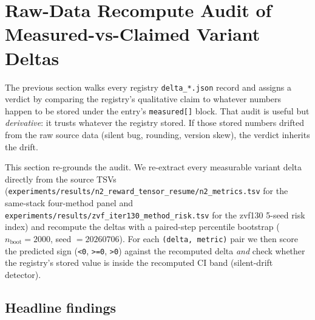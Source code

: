 \section{Raw-Data Recompute Audit of Measured-vs-Claimed Variant Deltas}
\label{sec:p6-iter190-raw-recompute}

The previous  section walks every registry
\texttt{delta\_*.json} record and assigns a verdict by comparing the
registry's qualitative claim to whatever numbers happen to be stored under
the entry's \texttt{measured[]} block. That audit is useful but
\emph{derivative}: it trusts whatever the registry stored. If those stored
numbers drifted from the raw source data (silent bug, rounding, version
skew), the verdict inherits the drift.

This section re-grounds the audit. We re-extract every measurable
variant delta directly from the source TSVs
(\texttt{experiments/results/n2\_reward\_tensor\_resume/n2\_metrics.tsv}
for the same-stack four-method panel and
\texttt{experiments/results/zvf\_iter130\_method\_risk.tsv} for the
zvf130 5-seed risk index) and recompute the deltas with a paired-step
percentile bootstrap ($n_{\text{boot}}{=}2000$, seed $=20260706$). For
each \texttt{(delta, metric)} pair we then score the predicted sign
(\texttt{<0}, \texttt{>=0}, \texttt{>0}) against the recomputed delta
\emph{and} check whether the registry's stored value is inside the
recomputed CI band (silent-drift detector).

\subsection{Headline findings}

